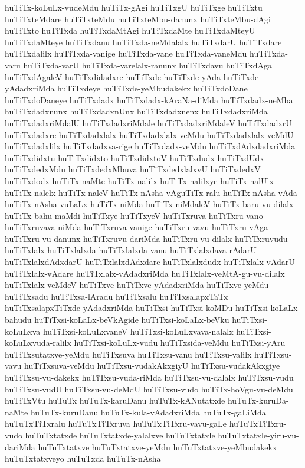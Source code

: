 {huTiTx-koLuLx-vudeMdu
huTiTx-gAgi
huTiTxgU
huTiTxge
huTiTxtu
huTiTxteMdare
huTiTxteMdu
huTiTxteMbu-danunx
huTiTxteMbu-dAgi
huTiTxto
huTiTxda
huTiTxdaMtAgi
huTiTxdaMte
huTiTxdaMteyU
huTiTxdaMteye
huTiTxdanu
huTiTxda-neMdalalx
huTiTxdarU
huTiTxdare
huTiTxdalilx
huTiTxda-vanige
huTiTxda-vane
huTiTxda-vaneMdu
huTiTxda-varu
huTiTxda-varU
huTiTxda-varelalx-ranunx
huTiTxdavu
huTiTxdAga
huTiTxdAgaleV
huTiTxdidadxre
huTiTxde
huTiTxde-yAda
huTiTxde-yAdadxriMda
huTiTxdeye
huTiTxde-yeMbudakekx
huTiTxdoDane
huTiTxdoDaneye
huTiTxdadx
huTiTxdadx-kAraNa-diMda
huTiTxdadx-neMba
huTiTxdadxnunx
huTiTxdadxnUnx
huTiTxdadxnenx
huTiTxdadxriMda
huTiTxdadxriMdalU
huTiTxdadxriMdale
huTiTxdadxriMdaleV
huTiTxdadxrU
huTiTxdadxre
huTiTxdadxlalx
huTiTxdadxlalx-veMdu
huTiTxdadxlalx-veMdU
huTiTxdadxlilx
huTiTxdadxva-rige
huTiTxdadx-veMdu
huTiTxdAdxdadxriMda
huTiTxdidxtu
huTiTxdidxto
huTiTxdidxtoV
huTiTxdudx
huTiTxdUdx
huTiTxdedxMdu
huTiTxdedxMbuva
huTiTxdedxlalxvU
huTiTxdedxV
huTiTxdodx
huTiTx-naMte
huTiTx-nalilx
huTiTx-nalilxye
huTiTx-nalUlx
huTiTx-nalelx
huTiTx-naleV
huTiTx-nAsha-vAguTiTx-ralu
huTiTx-nAsha-vAda
huTiTx-nAsha-vuLaLx
huTiTx-niMda
huTiTx-niMdaleV
huTiTx-baru-vu-dilalx
huTiTx-bahu-maMdi
huTiTxye
huTiTxyeV
huTiTxruva
huTiTxru-vano
huTiTxruvava-niMda
huTiTxruva-vanige
huTiTxru-vavu
huTiTxru-vAga
huTiTxru-vu-danunx
huTiTxruvu-dariMda
huTiTxru-vu-dilalx
huTiTxruvudu
huTiTxlalx
huTiTxlalxda
huTiTxlalxda-vanu
huTiTxlalxdava-rAdarU
huTiTxlalxdAdxdarU
huTiTxlalxdAdxdare
huTiTxlalxdudx
huTiTxlalx-vAdarU
huTiTxlalx-vAdare
huTiTxlalx-vAdadxriMda
huTiTxlalx-veMtA-gu-vu-dilalx
huTiTxlalx-veMdeV
huTiTxve
huTiTxve-yAdadxriMda
huTiTxve-yeMdu
huTiTxsadu
huTiTxsa-lAradu
huTiTxsalu
huTiTxsalapxTaTx
huTiTxsalapxTiTxde-yAdadxriMda
huTiTxsi
huTiTxsi-koMDu
huTiTxsi-koLaLx-bahudu
huTiTxsi-koLaLx-beVkAgide
huTiTxsi-koLaLx-beVku
huTiTxsi-koLuLxva
huTiTxsi-koLuLxvaneV
huTiTxsi-koLuLxvava-nalalx
huTiTxsi-koLuLxvuda-ralilx
huTiTxsi-koLuLx-vudu
huTiTxsida-veMdu
huTiTxsi-yAru
huTiTxsutatxve-yeMdu
huTiTxsuva
huTiTxsu-vanu
huTiTxsu-valilx
huTiTxsu-vavu
huTiTxsuva-veMdu
huTiTxsu-vudakAkxgiyU
huTiTxsu-vudakAkxgiye
huTiTxsu-vu-dakekx
huTiTxsu-vuda-riMda
huTiTxsu-vu-dalalx
huTiTxsu-vudu
huTiTxsu-vudU
huTiTxsu-vu-deMdU
huTiTxsu-vudo
huTiTx-hoVgu-vu-deMdu
huTiTxVtu
huTuTx
huTuTx-karuDanu
huTuTx-kANutatxde
huTuTx-kuruDa-naMte
huTuTx-kuruDanu
huTuTx-kula-vAdadxriMda
huTuTx-gaLiMda
huTuTxTiTxralu
huTuTxTiTxruva
huTuTxTiTxru-vavu-gaLe
huTuTxTiTxru-vudo
huTuTxtatxde
huTuTxtatxde-yalalxve
huTuTxtatxle
huTuTxtatxle-yiru-vu-dariMda
huTuTxtatxve
huTuTxtatxve-yeMdu
huTuTxtatxve-yeMbudakekx
huTuTxtatxveyo
huTuTxda
huTuTx-nAsha
}
